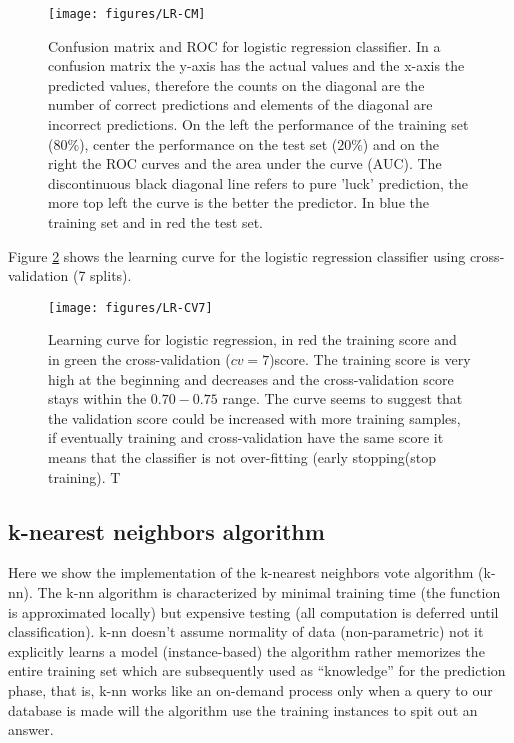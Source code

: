 \documentclass[11pt]{article}
\theoremstyle{definition}
\theoremstyle{remark}
\begin{document}
\begin{figure}[H]
        \centering
        \texttt{[image: figures/LR-CM]}
        \caption{Confusion matrix and ROC for logistic regression classifier. In a confusion matrix the y-axis has the actual values and the x-axis the predicted values, therefore the counts on the diagonal are the number of correct predictions and elements of the diagonal are incorrect predictions.
        On the left the performance of the training set ($80\%$), center the performance on the test set ($20\%$) and on the right the ROC curves and the area under the curve (AUC). The discontinuous black diagonal line refers to pure 'luck' prediction, the more top left the curve is the better the predictor. In blue the training set and in red the test set.}
\label{fig:lr-cm}
\end{figure}

Figure \ref{fig:lr-cv7} shows the learning curve for the logistic regression classifier using cross-validation (7 splits).
\begin{figure}[H]
        \centering
        \texttt{[image: figures/LR-CV7]}
        \caption{Learning curve for logistic regression, in red the training score and in green the cross-validation ($cv=7$)score. The training score is very high at the beginning and decreases and the cross-validation score stays within the $0.70-0.75$ range. The curve seems to suggest that the validation score could be increased with more training samples, if eventually training and cross-validation have the same score it means that the classifier is not over-fitting (early stopping(stop training). T
        } \label{fig:lr-cv7}
\end{figure}


\subsection{k-nearest neighbors algorithm}
\label{se:reskneighbors}
Here we show the implementation of the k-nearest neighbors vote algorithm (k-nn). The k-nn algorithm is characterized by minimal training time (the function is approximated locally) but expensive testing (all computation is deferred until classification).
k-nn doesn't assume normality of data (non-parametric) not it explicitly learns a model (instance-based) the algorithm rather memorizes the entire training set which are subsequently used as “knowledge” for the prediction phase, that is, k-nn works like an on-demand process only when a query to our database is made will the algorithm use the training instances to spit out an answer. 
\end{document}
